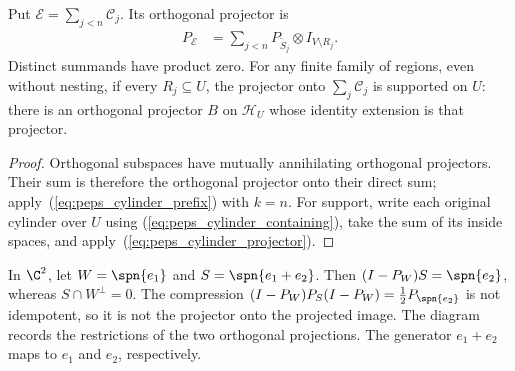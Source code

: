 \begin{lemma}
    \label{thm:peps_nested_cylinder_projector_sum}
    \leanok
    Put $\mathcal E=\sum_{j<n}\mathcal C_j$. Its orthogonal projector is
    \begin{align}
        P_{\mathcal E} & =\sum_{j<n}
        P_{\widetilde S_j}\otimes I_{V\setminus R_j}.
        \label{eq:peps_cylinder_total_projector}
    \end{align}
    Distinct summands have product zero. For any finite family of regions,
    even without nesting, if every $R_j\subseteq U$, the projector onto
    $\sum_j\mathcal C_j$ is supported on $U$: there is an orthogonal
    projector $B$ on $\mathcal H_U$ whose identity extension is that projector.
\end{lemma}
\begin{proof}
    \leanok
    Orthogonal subspaces have mutually annihilating orthogonal projectors.
    Their sum is therefore the orthogonal projector onto their direct sum;
    apply~(\ref{eq:peps_cylinder_prefix}) with $k=n$.
    For support, write each original cylinder over $U$ using
    (\ref{eq:peps_cylinder_containing}), take the sum of its inside spaces,
    and apply~(\ref{eq:peps_cylinder_projector}).
\end{proof}

\begin{samepage}
    \begin{remark}
        In $\C^2$, let $W=\spn\{e_1\}$ and $S=\spn\{e_1+e_2\}$.
        Then $(I-P_W)S=\spn\{e_2\}$, whereas $S\cap W^\perp=0$.
        The compression $(I-P_W)P_S(I-P_W)=\tfrac12 P_{\spn\{e_2\}}$
        is not idempotent, so it is not the projector onto the projected image.
        The diagram records the restrictions of the two orthogonal projections.
        The generator $e_1+e_2$ maps to $e_1$ and $e_2$, respectively.
        
    \end{remark}
\end{samepage}
